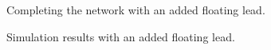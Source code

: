 \documentclass[fleqn,11pt,openany]{book}
\begin{document}
\begin{figure}
\caption{Completing the network with an added floating
lead.}\label{fig:network_6_b}
\end{figure}

\begin{figure}
\caption{Simulation results with an added floating
lead.}\label{fig:step_6_results}
\end{figure}
\end{document}

